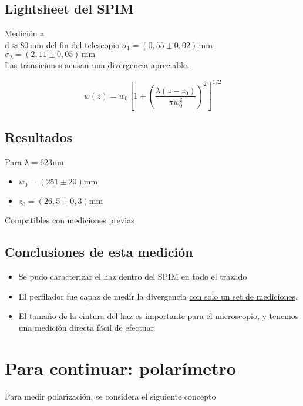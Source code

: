 \documentclass{article}
\begin{document}
    \subsection{Lightsheet del SPIM}
        Medición a \\d$\approx$80$\,$mm del fin del telescopio
        $\sigma_1 = (0,55 \pm 0,02)\,\text{mm}$\\
        $\sigma_2 = (2,11 \pm 0,05)\,\text{mm}$\\
        
        Las transiciones acusan una \underline{divergencia} apreciable.
        
        \[w(z) = w_0 \left[1 + \left(\frac{\lambda (z - z_0)}{\pi 
        w_0^2}\right)^2\right]^{1/2}\]

    \subsection{Resultados}
        Para $\lambda =  623\text{nm}$\\
        \begin{itemize}
            \item $w_0 = (251 \pm 20)\text{mm}$
            \item $z_0 = (26,5 \pm 0,3)\text{mm}$
        \end{itemize}
        Compatibles con mediciones previas 
    

    \subsection{Conclusiones de esta medición}
            \begin{itemize}
                \item Se pudo caracterizar el haz dentro del SPIM en todo el trazado
                \item El perfilador fue capaz de medir la divergencia \underline{con solo un set de mediciones}.
                \item El tamaño de la cintura del haz es importante para el microscopio, y tenemos una medición directa fácil de efectuar
            \end{itemize}
    
    
\section{Para continuar: polarímetro}
    Para medir polarización, se considera el siguiente concepto
    
\end{document}
